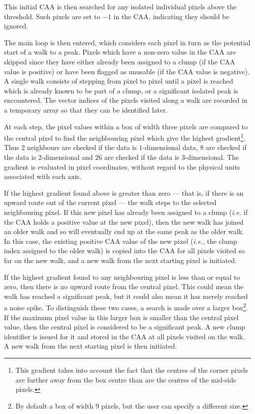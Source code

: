 \documentclass[final,authoryear,5p,times,twocolumn]{elsarticle}
\begin{document}
This initial CAA is then searched for any isolated individual pixels
above the threshold. Such pixels are set to $-1$ in the CAA, indicating
they should be ignored.

The main loop is then entered, which considers each pixel in turn as the
potential start of a walk to a peak. Pixels which have a non-zero value
in the CAA are skipped since they have either already been assigned to a
clump (if the CAA value is positive) or have been flagged as unusable (if
the CAA value is negative). A single walk consists of stepping from pixel
to pixel until a pixel is reached which is already known to be part of a
clump, or a significant isolated peak is encountered. The vector indices of
the pixels visited along a walk are recorded in a temporary array so that
they  can be identified later.

At each step, the pixel values within a box of width three pixels are compared
to the central pixel to find the neighbouring pixel which give the highest
gradient\footnote{This gradient takes into account the fact that the
centres of the corner pixels are further away from the box centre than
are the centres of the mid-side pixels.}. Thus 2 neighbours are checked if
the data is 1-dimensional data, 8 are checked if the data is 2-dimensional
and 26 are checked if the data is 3-dimensional. The gradient is
evaluated in pixel coordinates, without regard to the physical units
associated with each axis.

If the highest gradient found above is greater than zero --- that is, if
there is an upward route out of the current pixel --- the walk steps to the
selected neighbouring pixel. If this new pixel has already been assigned
to a clump (\emph{i.e.} if the CAA holds a positive value at the new
pixel), then the new walk has joined an older walk and so will eventually
end up at the same peak as the older walk. In this case, the existing
positive CAA value of the new pixel (\emph{i.e.}, the clump index assigned
to the older walk) is copied into the CAA for all pixels visited so far
on the new walk, and a new walk from the next starting pixel is
initiated.

If the highest gradient found to any neighbouring pixel is less than or
equal to zero, then there is no upward route from the central pixel. This
could mean the walk has reached a significant peak, but it could also
mean it has merely reached a noise spike. To distinguish these two cases,
a search is made over a larger box\footnote{By default a box of width 9
pixels, but the user can specify a different size.}. If the maximum pixel
value in this larger box is smaller than the central pixel value, then
the central pixel is considered to be a significant peak. A new clump
identifier is issued for it and stored in the CAA at all pixels visited
on the walk. A new walk from the next starting pixel is then initiated.
\end{document}
